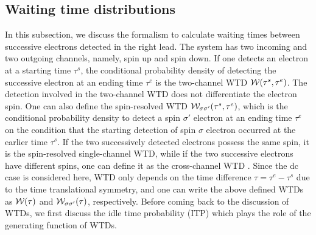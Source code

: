 \documentclass[aps,prb,twocolumn,footinbib,showpacs,superscriptaddress,preprintnumbers,amsmath,amssymb]{revtex4-1}
\begin{document}
\subsection{Waiting time distributions}
In this subsection, we discuss the formalism to calculate waiting times between successive electrons detected in the right lead. The system has two incoming and two outgoing channels, namely, spin up and spin down. If one detects an electron at a starting time $\tau^s$, the conditional probability density of detecting the successive electron at an ending time $\tau^e$ is the two-channel WTD ${\cal W}(\tau^s, \tau^e)$. The detection involved in the two-channel WTD does not differentiate the electron spin. One can also define the spin-resolved WTD ${\cal W}_{\sigma\sigma'}(\tau^s, \tau^e)$, which is the conditional probability density to detect a spin $\sigma'$ electron at an ending time $\tau^e$ on the condition that the starting detection of spin $\sigma$ electron occurred at the earlier time $\tau^s$. If the two successively detected electrons possess the same spin, it is the spin-resolved single-channel WTD, while if the two successive electrons have different spins, one can define it as the cross-channel WTD \cite{WTD_correlated}. Since the dc case is considered here, WTD only depends on the time difference $\tau = \tau^e-\tau^s$ due to the time translational symmetry, and one can write the above defined WTDs as ${\cal W}(\tau)$ and ${\cal W}_{\sigma\sigma'}(\tau)$, respectively.
Before coming back to the discussion of WTDs, we first discuss the idle time probability (ITP) which plays the role of the generating function of WTDs.
		
\end{document}

